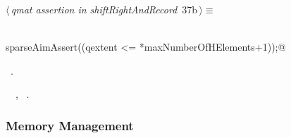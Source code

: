 \documentclass{article}
\begin{document}
\begin{flushleft} \small
\begin{minipage}{\linewidth}\label{scrap45}\raggedright\small
{} $\langle\,${\itshape qmat assertion in shiftRightAndRecord}\nobreak\ {\footnotesize {37b}}$\,\rangle\equiv$
\vspace{-1ex}
\begin{list}{}{} \item
\mbox{}\verb@@\\
\mbox{}\verb@      sparseAimAssert((qextent <= *maxNumberOfHElements+1));@\\
\mbox{}\verb@@{\NWsep}
\end{list}
\vspace{-1.5ex}
\footnotesize
\begin{list}{}{\setlength{\itemsep}{-\parsep}\setlength{\itemindent}{-\leftmargin}}
\item \NWtxtMacroRefIn\ .
\item \NWtxtIdentsUsed\nobreak\  \verb@maxNumberOfHElements@\nobreak\ , \verb@qextent@\nobreak\ .
\item{}
\end{list}
\end{minipage}\vspace{4ex}
\end{flushleft}
\subsubsection{Memory Management}
\end{document}
